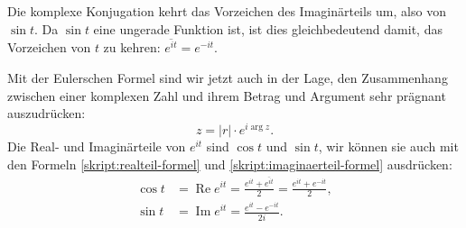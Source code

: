 Die komplexe Konjugation kehrt das Vorzeichen des Imaginärteils um, also 
von $\sin t$. Da $\sin t$ eine ungerade Funktion ist, ist dies gleichbedeutend
damit, das Vorzeichen von $t$ zu kehren: $\overline{e^{it}}=e^{-it}$.

Mit der Eulerschen Formel sind wir jetzt auch in der Lage, den Zusammenhang
zwischen einer komplexen Zahl und ihrem Betrag und Argument sehr prägnant
auszudrücken:
\[
z=|r|\cdot e^{i\operatorname{arg}z}.
\]
Die Real- und Imaginärteile von $e^{it}$ sind $\cos t$ und $\sin t$,
wir können sie auch mit den Formeln \eqref{skript:realteil-formel} und
\eqref{skript:imaginaerteil-formel} ausdrücken:
\begin{align*}
\cos t
&=
\operatorname{Re}e^{it}
=
\frac{e^{it}+\overline{e^{it}}}2
=
\frac{e^{it}+e^{-it}}2,
\\
\sin t
&=
\operatorname{Im}e^{it}=\frac{e^{it}-e^{-it}}{2i}.
\end{align*}

